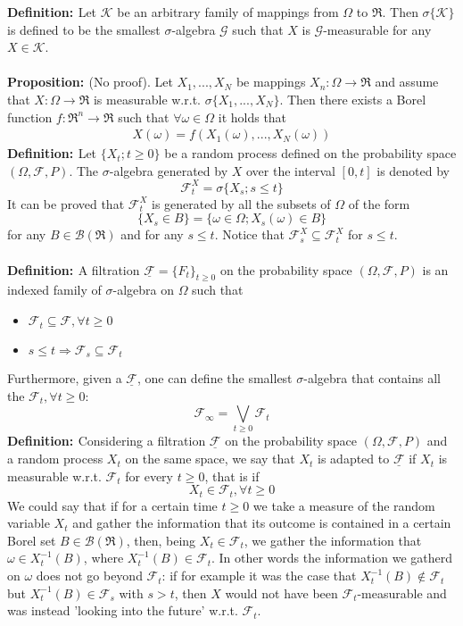 \documentclass[a4paper,10pt]{report}
\theoremstyle{plain}
\theoremstyle{definition}
\newcommand\be{\begin{eqnarray}}    %
\newcommand\ee{\end{eqnarray}}
\newcommand{\DEF} {{\bf{Definition: }}}
\newcommand{\PROP} {{\bf{Proposition: }}}
\newcommand{\SA} {{$\sigma$-algebra} }
\newcommand{\FF} {\mathcal{F} }
\newcommand{\BOREL} {{\mathcal{B}(\Re)} }
\newcommand{\FLT} {\underline{\mathcal{F}}}
\begin{document}
\DEF Let $\mathcal{K}$ be an arbitrary family of mappings from $\Omega$ to $\Re$. Then $\sigma\{\mathcal{K}\}$ is defined to be the smallest \SA $\mathcal{G}$ such that $X$ is $\mathcal{G}$-measurable for any $X\in \mathcal{K}$.\\ \\
\PROP
(No proof). Let $X_1,...,X_N$ be mappings $X_n:\Omega \rightarrow \Re$ and assume that $X:\Omega \rightarrow \Re$ is measurable w.r.t. $\sigma\{X_1,...,X_N\}$. Then there exists a Borel function $f:\Re^n\rightarrow \Re$ such that $\forall \omega \in \Omega$ it holds that
\be
X(\omega)=f(X_1(\omega),...,X_N(\omega))
\label{borelfunct}
\ee
\DEF Let $\{X_t;t\ge 0\}$ be a random process defined on the probability space $(\Omega, \FF, P)$. The \SA generated by $X$ over the interval $[0,t]$ is denoted by
\[
\FF_t^X=\sigma\{X_s;s\leq t\}
\]
It can be proved that $\FF_t^X$ is generated by all the subsets of $\Omega$ of the form
\[
\{X_s\in B\}=\{\omega\in\Omega;X_s(\omega)\in B\}
\]
for any $B\in \BOREL$ and for any $s\leq t$. Notice that $\FF_s^X\subseteq \FF_t^X$ for $s\leq t$.\\ \\
\DEF A filtration $\FLT=\{F_t\}_{t\ge 0}$ on the probability space $(\Omega,\FF,P)$ is an indexed family of \SA on $\Omega$ such that
\begin{itemize}
\item $\FF_t\subseteq \FF, \forall t\ge 0$
\item $s\leq t \Rightarrow \FF_s\subseteq \FF_t$
\end{itemize}
Furthermore, given a $\FLT$, one can define the smallest \SA that contains all the $\FF_t, \forall t\ge 0$:
\[
\FF_\infty = \bigvee_{t\ge 0} \FF_t
\]
\DEF Considering a filtration $\FLT$ on  the probability space $(\Omega,\FF,P)$ and a random process $X_t$ on the same space, we say that $X_t$ is adapted to $\FLT$ if $X_t$ is measurable w.r.t. $\FF_t$ for every $t\ge 0$, that is if
\[
X_t\in \FF_t, \forall t\ge 0
\]
We could say that if for a certain time $t\ge 0$ we take a measure of the random variable $X_t$ and gather the information that its outcome is contained in a certain Borel set $B\in \BOREL$, then, being $X_t\in \FF_t$, we gather the information that $\omega\in X_t^{-1}(B)$, where $X_t^{-1}(B)\in \FF_t$.
In other words the information we gatherd on $\omega$ does not go beyond $\FF_t$: if for example it was the case that $X_t^{-1}(B)\not\in\FF_t$ but $X_t^{-1}(B)\in\FF_s$ with $s>t$, then $X$ would not have been $\FF_t$-measurable and was instead 'looking into the future' w.r.t. $\FF_t$.\\ \\
\end{document}
